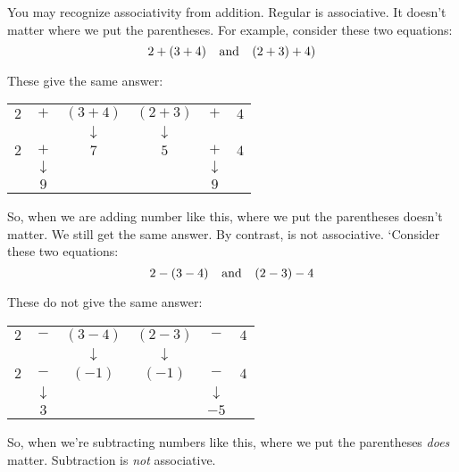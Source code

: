 \documentclass[../../../main.tex]{subfiles}
\begin{document}
\begin{aside}
  \begin{remark}
    You may recognize associativity from addition. Regular  is associative. It doesn't matter where we put the parentheses. For example, consider these two equations: 
    \begin{equation*}
      2 + (3 + 4) \hskip 0.25cm \text{ and } \hskip 0.25cm (2 + 3) + 4)
    \end{equation*}
    
    These give the same answer:
    \begin{center}
      \begin{tabular}{c c c | c c c}
        $2$ & $+$          & $(3 + 4)$    & $(2 + 3)$    & $+$          & $4$ \\
            &              & $\downarrow$ & $\downarrow$ &              &     \\
        $2$ & $+$          & $7$          & $5$          & $+$          & $4$ \\
            & $\downarrow$ &              &              & $\downarrow$ &     \\
            & $9$          &              &              & $9$          &
      \end{tabular}
    \end{center}
    
    So, when we are adding number like this, where we put the parentheses doesn't matter. We still get the same answer. By contrast,  is not associative. `Consider these two equations:
    \begin{equation*}
      2 - (3 - 4) \hskip 0.25cm \text{ and } \hskip 0.25cm (2 - 3) - 4
    \end{equation*}
    
    These do not give the same answer: 
    \begin{center}
      \begin{tabular}{c c c | c c c}
        $2$ & $-$          & $(3 - 4)$    & $(2 - 3)$    & $-$          & $4$ \\
            &              & $\downarrow$ & $\downarrow$ &              &     \\
        $2$ & $-$          & $(-1)$       & $(-1)$       & $-$          & $4$ \\
            & $\downarrow$ &              &              & $\downarrow$ &     \\
            & $3$          &              &              & $-5$         &
      \end{tabular}
    \end{center}
    
    So, when we're subtracting numbers like this, where we put the parentheses \emph{does} matter. Subtraction is \emph{not} associative.
  \end{remark}
\end{aside}
\end{document}

